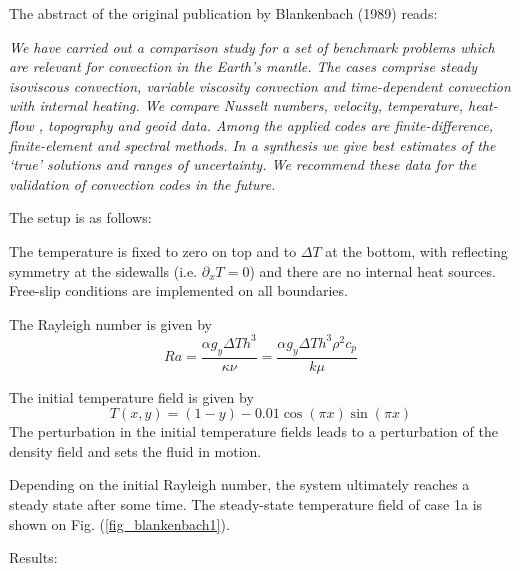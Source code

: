 
The abstract of the original publication by Blankenbach \etal (1989) \cite{blbc89} reads:
\begin{center}
{\it 
We have carried out a comparison study for a set of benchmark problems 
which are relevant for convection in the Earth’s mantle. The cases comprise 
steady isoviscous convection, variable viscosity convection and time-dependent 
convection with internal heating. We compare Nusselt numbers, velocity, 
temperature, heat-flow , topography and geoid data. Among the applied codes 
are finite-difference, finite-element and spectral methods. In a synthesis 
we give best estimates of the ‘true’ solutions and ranges of uncertainty. We
recommend these data for the validation of convection codes in the future.
}
\end{center}

The setup is as follows:

The temperature is fixed to zero on top and to $\Delta T$ at the bottom, 
with reflecting symmetry at the sidewalls (i.e. $\partial_x T=0$) 
and there are no internal heat sources. 
Free-slip conditions are implemented on all boundaries. 

The Rayleigh number is given by
\[
Ra = \frac{\alpha g_y \Delta T h^3 }{\kappa \nu}
=\frac{\alpha g_y \Delta T h^3 \rho^2 c_p}{k \mu}
\]

The initial temperature field is given by 
\[
T(x,y)=(1-y) - 0.01\cos(\pi x) \sin(\pi x)
\]
The perturbation in the initial temperature fields leads to 
a perturbation of the density field and sets the fluid in motion. 

Depending on the initial Rayleigh number, the system ultimately reaches a 
steady state after some time. The steady-state 
temperature field of case 1a is shown on Fig. (\ref{fig_blankenbach1}).



Results:


